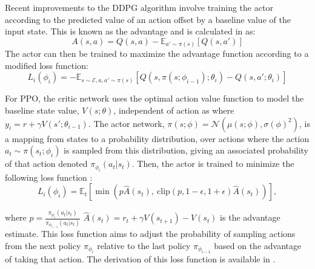 Recent improvements to the DDPG algorithm involve training the actor according to the predicted value of an action offset by a baseline value of the input state. This is known as the advantage and is calculated in \cite{2.1.2} as:
\begin{dmath}
	A(s,a) = Q(s,a) - \mathbb{E}_{a' \sim \pi(s)} \left[ Q(s,a') \right]
\end{dmath}
The actor can then be trained to maximize the advantage function according to a modified loss function:
\begin{dmath}
	L_i(\phi_i) = -\mathbb{E}_{s \sim \mathcal{E}, a,a' \sim \pi(s)} \left[ Q(s,\pi(s;\phi_{i-1});\theta_i) - Q(s,a';\theta_i) \right]
\end{dmath}

For PPO, the critic network uses the optimal action value function to model the baseline state value, $V(s;\theta)$, independent of action as where $y_i = r + \gamma V(s';\theta_{i-1})$. The actor network, $\pi(s;\phi) = \mathcal{N}(\mu(s;\phi),\sigma(\phi)^2)$, is a mapping from states to a probability distribution, over actions where the action $a_t \sim \pi(s_t;\phi_i)$ is sampled from this distribution, giving an associated probability of that action denoted $\pi_{\phi_i}(a_t|s_t)$. Then, the actor is trained to minimize the following loss function \cite{2.3}:
\begin{dmath}
	L_i(\phi_i) = \mathbb{E}_{t} \left[\min \left( p \hat{A}(s_t),\ \textrm{clip} \left(p, 1-\epsilon, 1+\epsilon \right) \hat{A}(s_t) \right) \right],
\end{dmath} 

where $p = \frac{\pi_{\phi_i}(a_t|s_t)}{\pi_{\phi_{i-1}}(a_t|s_t)}$ $\hat{A}(s_t) = r_t + \gamma V(s_{t+1}) - V(s_{t})$ is the advantage estimate. This loss function aims to adjust the probability of sampling actions from the next policy $\pi_{\phi_i}$ relative to the last policy $\pi_{\phi_{i-1}}$ based on the advantage of taking that action. The derivation of this loss function is available in \cite{2.3}.

